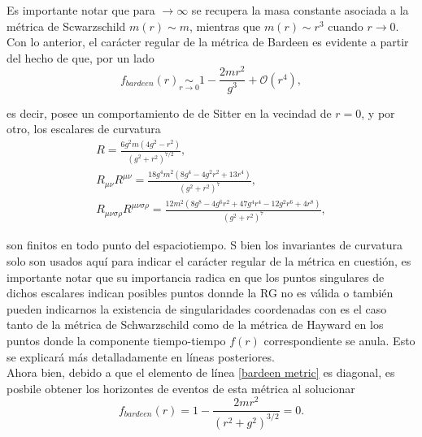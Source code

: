 \documentclass[16pt,a4paper]{article}
\numberwithin{equation}{section}
\theoremstyle{definition}
\begin{document}
Es importante notar que para $ \to \infty$ se recupera la masa constante asociada a la métrica de Scwarzschild $m(r) \sim m$, mientras que $m(r) \sim r^3$ cuando $r \to 0$. Con lo anterior, el carácter regular de la métrica de Bardeen es evidente a partir del hecho de que, por un lado
\begin{equation}
f_{bardeen}(r) \underset{r \to 0}{\sim} 1 - \frac{2mr^2}{g^3} + \mathcal{O}(r^4),
\end{equation}

es decir, posee un comportamiento de de Sitter en la vecindad de $r = 0$, y por otro, los escalares de curvatura
\begin{equation}
\label{bardeen scalars}
\begin{gathered}
R = \frac{6 g^2 m \left(4 g^2-r^2\right)}{\left(g^2+r^2\right)^{7/2}},\\
R_{\mu \nu}R^{\mu \nu} = \frac{18 g^4 m^2 \left(8 g^4-4 g^2 r^2+13 r^4\right)}{\left(g^2+r^2\right)^7},\\
R_{\mu \nu \sigma \rho}R^{\mu \nu \sigma \rho} = \frac{12 m^2 \left(8 g^8-4 g^6 r^2+47 g^4 r^4-12 g^2 r^6+4 r^8\right)}{\left(g^2+r^2\right)^7},
\end{gathered}
\end{equation}

son finitos en todo punto  del espaciotiempo. S bien los invariantes de curvatura solo son usados aquí para indicar el carácter regular de la métrica en cuestión, es importante notar que su importancia radica en que los puntos singulares de dichos escalares indican posibles puntos donnde la RG no es válida o también pueden indicarnos la existencia de singularidades coordenadas con es el caso tanto de la métrica de Schwarzschild como de la métrica de Hayward en los puntos donde la componente tiempo-tiempo $f(r)$ correspondiente se anula. Esto se explicará más detalladamente en líneas posteriores.\\

Ahora bien, debido a que el elemento de línea \eqref{bardeen metric} es diagonal, es posbile obtener los horizontes de eventos de esta métrica al solucionar
\begin{equation}
f_{bardeen}(r) = 1 - \frac{2mr^2}{(r^2 + g^2)^{3/2}} = 0.
\end{equation}
\end{document}
